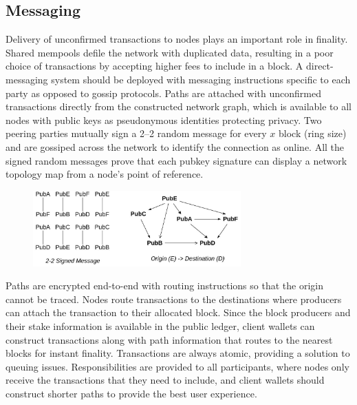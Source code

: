 \documentclass[a4paper,	10pt]{extarticle}
\begin{document}
\subsection{Messaging}
Delivery of unconfirmed transactions to nodes plays an important role in finality. Shared mempools defile the network with duplicated data, resulting in a poor choice of transactions by accepting higher fees to include in a block. A direct-messaging system should be deployed with messaging instructions specific to each party as opposed to gossip protocols. Paths are attached with unconfirmed transactions directly from the constructed network graph, which is available to all nodes with public keys as pseudonymous identities protecting privacy. Two peering parties mutually sign a 2–2 random message for every $x$ block (ring size) and are gossiped across the network to identify the connection as online. All the signed random messages prove that each pubkey signature can display a network topology map from a node's point of reference. \\
\begin{figure}[H]
\begin{center}
\includegraphics[width=8cm]{topology}
\end{center}
\end{figure}
Paths are encrypted end-to-end with routing \cite{poon2016bitcoin} instructions so that the origin cannot be traced. Nodes route transactions to the destinations where producers can attach the transaction to their allocated block. Since the block producers and their stake information is available in the public ledger, client wallets can construct transactions along with path information that routes to the nearest blocks for instant finality. Transactions are always atomic, providing a solution to queuing issues. Responsibilities are provided to all participants, where nodes only receive the transactions that they need to include, and client wallets should construct shorter paths to provide the best user experience.
\end{document}
